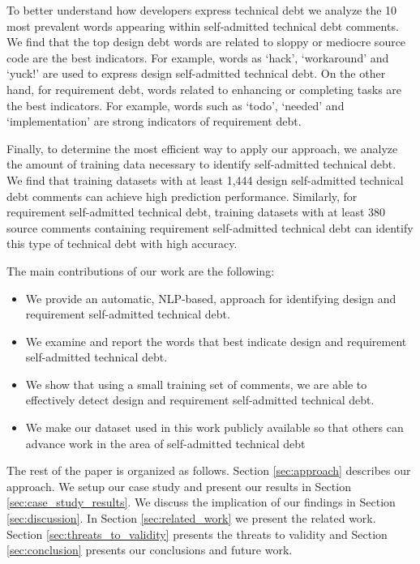 \documentclass[10pt,journal,compsoc]{IEEEtran}
\newcommand{\SATD}{self-admitted technical debt\xspace}
\begin{document}
To better understand how developers express technical debt we analyze the 10 most prevalent words appearing within \SATD comments. 
We find that the top design debt words are related to sloppy or mediocre source code are the best indicators. For example, words as `hack', `workaround' and `yuck!' are used to express design \SATD. On the other hand, for requirement debt, words related to enhancing or completing tasks are the best indicators. For example, words such as `todo', `needed' and `implementation' are strong indicators of requirement debt. 

Finally, to determine the most efficient way to apply our approach, we analyze the amount of training data necessary to identify \SATD. We find that training datasets with at least 1,444 design \SATD comments can achieve high prediction performance. Similarly, for requirement \SATD, training datasets with at least 380 source comments containing requirement \SATD can identify this type of technical debt with high accuracy.  

The main contributions of our work are the following:
\vspace{-1.5mm}
\begin{itemize}
  \item We provide an automatic, NLP-based, approach for identifying design and requirement \SATD.
  \item We examine and report the words that best indicate design and requirement \SATD.
  \item We show that using a small training set of comments, we are able to effectively detect design and requirement \SATD.
  \item We make our dataset used in this work publicly available so that others can advance work in the area of \SATD
\end{itemize}

The rest of the paper is organized as follows. Section \ref{sec:approach} describes our approach. We setup our case study and present our
results in Section \ref{sec:case_study_results}. We discuss the implication of our findings in Section \ref{sec:discussion}. In Section \ref{sec:related_work} we present the related work. Section \ref{sec:threats_to_validity} presents the threats to validity and Section \ref{sec:conclusion} presents our conclusions and future work.  
\end{document}
